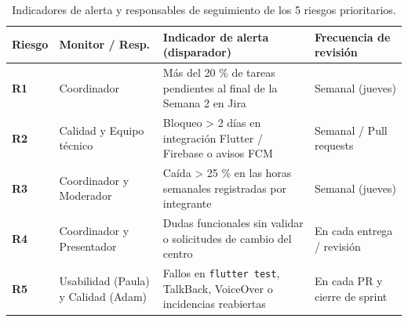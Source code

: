 \documentclass[11pt,a4paper]{article}
\begin{document}
\begin{table}[htbp]
  \centering
  \footnotesize
  \caption{Indicadores de alerta y responsables de seguimiento de los 5 riesgos prioritarios.}
  \label{tab:indicadores}
  \begin{tabularx}{\linewidth}{@{}L{1.1cm} L{3.2cm} Y L{3.4cm}@{}}
    \toprule
    \textbf{Riesgo} & \textbf{Monitor / Resp.} & \textbf{Indicador de alerta (disparador)} & \textbf{Frecuencia de revisión} \\
    \midrule
    \textbf{R1} & Coordinador & Más del 20 \% de tareas pendientes al final de la Semana 2 en Jira & Semanal (jueves) \\
    \textbf{R2} & Calidad y Equipo técnico & Bloqueo > 2 días en integración Flutter / Firebase o avisos FCM & Semanal / Pull requests \\
    \textbf{R3} & Coordinador y Moderador & Caída > 25 \% en las horas semanales registradas por integrante & Semanal (jueves) \\
    \textbf{R4} & Coordinador y Presentador & Dudas funcionales sin validar o solicitudes de cambio del centro & En cada entrega / revisión \\
    \textbf{R5} & Usabilidad (Paula) y Calidad (Adam) & Fallos en \texttt{flutter test}, TalkBack, VoiceOver o incidencias reabiertas & En cada PR y cierre de sprint \\
    \bottomrule
  \end{tabularx}
\end{table}
\end{document}
